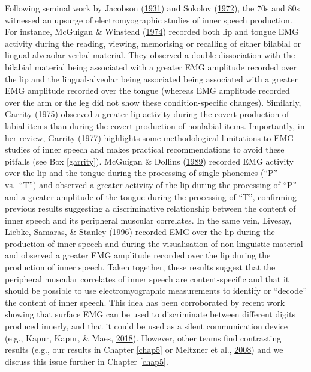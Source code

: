 \documentclass[a4paper,12pt,twoside,onecolumn,openright,final,oldfontcommands]{memoir}
\begin{document}
Following seminal work by Jacobson (\protect\hyperlink{ref-jacobson_electrical_1931}{1931}) and Sokolov (\protect\hyperlink{ref-sokolov_inner_1972}{1972}), the 70s and 80s witnessed an upsurge of electromyographic studies of inner speech production. For instance, McGuigan \& Winstead (\protect\hyperlink{ref-mcguigan_discriminative_1974}{1974}) recorded both lip and tongue EMG activity during the reading, viewing, memorising or recalling of either bilabial or lingual-alveaolar verbal material. They observed a double dissociation with the bilabial material being associated with a greater EMG amplitude recorded over the lip and the lingual-alveolar being associated being associated with a greater EMG amplitude recorded over the tongue (whereas EMG amplitude recorded over the arm or the leg did not show these condition-specific changes). Similarly, Garrity (\protect\hyperlink{ref-garrity_measurement_1975}{1975}) observed a greater lip activity during the covert production of labial items than during the covert production of nonlabial items. Importantly, in her review, Garrity (\protect\hyperlink{ref-garrity_electromyography_1977}{1977}) highlights some methodological limitations to EMG studies of inner speech and makes practical recommendations to avoid these pitfalls (see Box \ref{garrity}). McGuigan \& Dollins (\protect\hyperlink{ref-mcguigan_patterns_1989}{1989}) recorded EMG activity over the lip and the tongue during the processing of single phonemes (\enquote{P} vs.~\enquote{T}) and observed a greater activity of the lip during the processing of \enquote{P} and a greater amplitude of the tongue during the processing of \enquote{T}, confirming previous results suggesting a discriminative relationship between the content of inner speech and its peripheral muscular correlates. In the same vein, Livesay, Liebke, Samaras, \& Stanley (\protect\hyperlink{ref-livesay_covert_1996}{1996}) recorded EMG over the lip during the production of inner speech and during the visualisation of non-linguistic material and observed a greater EMG amplitude recorded over the lip during the production of inner speech. Taken together, these results suggest that the peripheral muscular correlates of inner speech are content-specific and that it should be possible to use electromyographic measurements to identify or \enquote{decode} the content of inner speech. This idea has been corroborated by recent work showing that surface EMG can be used to discriminate between different digits produced innerly, and that it could be used as a silent communication device (e.g., Kapur, Kapur, \& Maes, \protect\hyperlink{ref-kapur_alterego_2018}{2018}). However, other teams find contrasting results (e.g., our results in Chapter \ref{chap5} or Meltzner et al., \protect\hyperlink{ref-meltzner_speech_2008}{2008}) and we discuss this issue further in Chapter \ref{chap5}.
\end{document}
